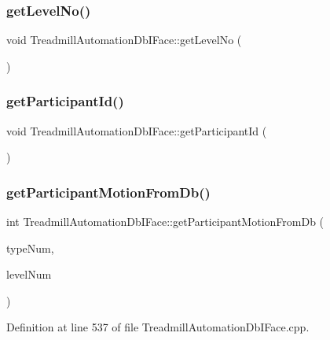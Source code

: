 \subsubsection{\texorpdfstring{get\+Level\+No()}{getLevelNo()}}
{\footnotesize\ttfamily void Treadmill\+Automation\+Db\+I\+Face\+::get\+Level\+No (\begin{DoxyParamCaption}{ }\end{DoxyParamCaption})}

\mbox{\label{class_treadmill_automation_db_i_face_aa15c26329baad5935896f9d352f96082}} 
\subsubsection{\texorpdfstring{get\+Participant\+Id()}{getParticipantId()}}
{\footnotesize\ttfamily void Treadmill\+Automation\+Db\+I\+Face\+::get\+Participant\+Id (\begin{DoxyParamCaption}{ }\end{DoxyParamCaption})}

\mbox{\label{class_treadmill_automation_db_i_face_a80f861f6d15119a7b6ead07817393f6e}} 
\subsubsection{\texorpdfstring{get\+Participant\+Motion\+From\+Db()}{getParticipantMotionFromDb()}}
{\footnotesize\ttfamily int Treadmill\+Automation\+Db\+I\+Face\+::get\+Participant\+Motion\+From\+Db (\begin{DoxyParamCaption}\item[{Q\+String}]{type\+Num,  }\item[{Q\+String}]{level\+Num }\end{DoxyParamCaption})}



Definition at line 537 of file Treadmill\+Automation\+Db\+I\+Face.\+cpp.

